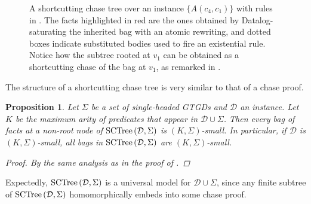 \documentclass[12pt]{report}
\theoremstyle{plain}
\newtheorem{proposition}[theorem]{Proposition}
\theoremstyle{definition}
\newcommand{\SCTree}[2]{\ensuremath{\normalfont{\textrm{SCTree}} \left( #1, #2 \right)}}
\begin{document}
\begin{figure}[t]
  \centering
  
  \caption{A shortcutting chase tree over an instance $\{ A(c_4, c_1) \}$ with rules in . The facts highlighted in red are the ones obtained by Datalog-saturating the inherited bag with an atomic rewriting, and dotted boxes indicate substituted bodies used to fire an existential rule. Notice how the subtree rooted at $v_1$ can be obtained as a shortcutting chase of the bag at $v_1$, as remarked in .}
  \label{sctree-simple-example-diagram}
\end{figure}

The structure of a shortcutting chase tree is very similar to that of a chase proof.

\begin{proposition}
\label{each-bag-in-sctree-is-k-sigma-small}
  Let $\Sigma$ be a set of single-headed GTGDs and $\mathcal{D}$ an instance. Let $K$ be the maximum arity of predicates that appear in $\mathcal{D} \cup \Sigma$. Then every bag of facts at a non-root node of \emph{$\SCTree{\mathcal{D}}{\Sigma}$} is $(K, \Sigma)$-small. In particular, if $\mathcal{D}$ is $(K, \Sigma)$-small, all bags in $\SCTree{\mathcal{D}}{\Sigma}$ are $(K, \Sigma)$-small.
  \begin{proof}
    By the same analysis as in the proof of .
  \end{proof}
\end{proposition}

Expectedly, $\SCTree{\mathcal{D}}{\Sigma}$ is a universal model for $\mathcal{D} \cup \Sigma$, since any finite subtree of $\SCTree{\mathcal{D}}{\Sigma}$ homomorphically embeds into some chase proof.
\end{document}
